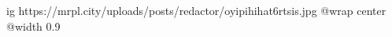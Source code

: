  
 
 
 
 

\ifcmt
  ig https://mrpl.city/uploads/posts/redactor/oyipihihat6rtsis.jpg
  @wrap center
  @width 0.9
\fi
